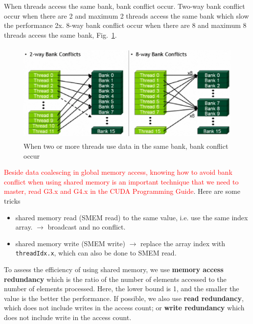 When threads access the same bank, bank conflict occur. Two-way bank
conflict occur when there are 2 and maximum 2 threads access the same
bank which slow the performance 2x. 8-way bank conflict occur when
there are 8 and maximum 8 threads access the same bank,
Fig.~\ref{fig:bank_conflict}.

\begin{figure}[hbt]
  \centerline{\includegraphics[height=5cm,
    angle=0]{./images/bank_conflict.eps}}
  \caption{When two or more threads use data in the same bank, bank
    conflict occur}
  \label{fig:bank_conflict}
\end{figure}

\textcolor{red}{Beside data coalescing in global memory access,
  knowing how to avoid bank conflict when using shared memory is an
  important technique that we need to master, read G3.x and G4.x in
  the CUDA Programming Guide}. Here are some tricks
\begin{itemize}
\item shared memory read (SMEM read) to the same value, i.e. use the
  same index array. $\rightarrow $ broadcast and no conflict.
\item shared memory write (SMEM write) $\rightarrow$ replace the
  array index with \verb!threadIdx.x!, which can also be done to SMEM
  read. 
\end{itemize}

To assess the efficiency of using shared memory, we use {\bf memory
  access redundancy} which is the ratio of the number of elements
accessed to the number of elements processed. Here, the lower bound is
1, and the smaller the value is the better the performance. 
If possible, we also use {\bf read redundancy}, which does not include
writes in the access count; or {\bf write redundancy} which does not
include write in the access count. 


